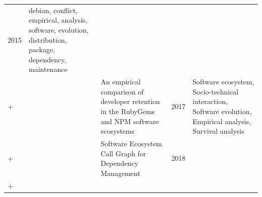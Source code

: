 \documentclass[]{book}
\begin{document}
\begin{longtable}[]{@{}lllll@{}}
\begin{minipage}[t]{0.02\columnwidth}
2015\strut
\end{minipage} & \begin{minipage}[t]{0.39\columnwidth}\raggedright\strut
debian, conflict, empirical, analysis, software, evolution,
distribution, package, dependency, maintenance\strut
\end{minipage}\tabularnewline
\begin{minipage}[t]{0.01\columnwidth}\raggedright\strut
+\strut
\end{minipage} & \begin{minipage}[t]{0.09\columnwidth}\raggedright\strut
\citet{Constantinou2017}\strut
\end{minipage} & \begin{minipage}[t]{0.34\columnwidth}\raggedright\strut
An empirical comparison of developer retention in the RubyGems and NPM
software ecosystems\strut
\end{minipage} & \begin{minipage}[t]{0.02\columnwidth}\raggedright\strut
2017\strut
\end{minipage} & \begin{minipage}[t]{0.39\columnwidth}\raggedright\strut
Software ecosystem, Socio-technical interaction, Software evolution,
Empirical analysis, Survival analysis\strut
\end{minipage}\tabularnewline
\begin{minipage}[t]{0.01\columnwidth}\raggedright\strut
+\strut
\end{minipage} & \begin{minipage}[t]{0.09\columnwidth}\raggedright\strut
\citet{Hejderup2018}\strut
\end{minipage} & \begin{minipage}[t]{0.34\columnwidth}\raggedright\strut
Software Ecosystem Call Graph for Dependency Management\strut
\end{minipage} & \begin{minipage}[t]{0.02\columnwidth}\raggedright\strut
2018\strut
\end{minipage} & \begin{minipage}[t]{0.39\columnwidth}\raggedright\strut
\strut
\end{minipage}\tabularnewline
\begin{minipage}[t]{0.01\columnwidth}\raggedright\strut
+\strut
\end{minipage} & \begin{minipage}[t]{0.09\columnwidth}\raggedright\strut
\citet{Kikas2017}\strut
\end{minipage} & \begin{minipage}[t]{0.34\columnwidth}\raggedright\strut

\end{minipage}
\end{longtable}
\end{document}
